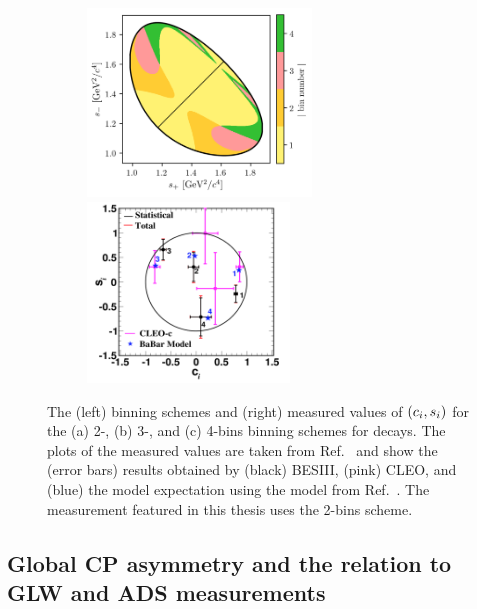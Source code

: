 \begin{figure}[p]
\begin{subfigure}{\columnwidth}
        \caption{}
        \label{fig:kskk_bins_3}
    \end{subfigure}
    \begin{subfigure}{\columnwidth}
        \centering
        \includegraphics[height=5cm,valign=t]{figures/theory/binnings/KsKK_4bins.png}
        \includegraphics[height=4.8cm,valign=t]{figures/theory/bes_kskk_4bins.png}
        \caption{}
        \label{fig:kskk_bins_4}
    \end{subfigure}
    \caption{The (left) binning schemes and (right) measured values of $(c_i,s_i)$ for the (a) 2-, (b) 3-, and (c) 4-bins binning schemes for \DtoKsKK decays. The plots of the measured values are taken from Ref.~\cite{BESCISIKSKK} and show the (error bars) results obtained by (black) BESIII, (pink) CLEO, and (blue) the model expectation using the model from Ref.~\cite{BABAR2010}.
    The measurement featured in this thesis uses the 2-bins scheme.}
    \label{fig:kskk_bins}
\end{figure}





\subsection{Global CP asymmetry and the relation to GLW and ADS measurements} %
\label{sub:relation_to_glw_and_ads_measurements}



